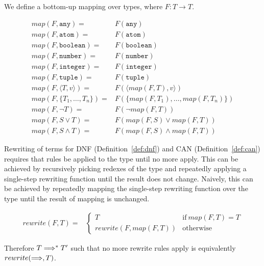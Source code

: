 \documentclass[nonacm,timestamp,manuscript]{acmart}
\newcommand{\atom}[1]{\texttt{#1}}
\newcommand{\singleton}[2]{\langle #1, #2 \rangle} %
\begin{document}
We define a bottom-up mapping over types, where $F : T \rightarrow T$.

\begin{align*}
  map(F, \atom{any}) ={}& F(\atom{any}) \\
  map(F, \atom{atom}) ={}& F(\atom{atom}) \\
  map(F, \atom{boolean}) ={}& F(\atom{boolean}) \\
  map(F, \atom{number}) ={}& F(\atom{number}) \\
  map(F, \atom{integer}) ={}& F(\atom{integer}) \\
  map(F, \atom{tuple}) = {}& F(\atom{tuple}) \\
  map(F, \singleton{T}{v}) ={}& F(\singleton{map(F, T)}{v}) \\
  map(F, \{ T_1, \ldots, T_n \}) ={}& F( \{ map(F, T_1), \ldots, map(F, T_n) \}) \\
  map(F, \neg T) ={}& F(\neg map(F, T)) \\
  map(F, S \lor T) ={}& F(map(F, S) \lor map(F, T)) \\
  map(F, S \land T) ={}& F(map(F, S) \land map(F, T))
\end{align*}


Rewriting of terms for DNF (Definition~\ref{def:dnf}) and CAN
(Definition~\ref{def:can}) requires that rules be applied to the type until no
more apply. This can be achieved by recursively picking redexes of the type
and repeatedly applying a single-step rewriting function until the result does
not change. Naively, this can be achieved by repeatedly mapping the single-step
rewriting function over the type until the result of mapping is unchanged.

\begin{align*}
  rewrite(F, T) ={}&
                     \begin{cases}
                       T & \text{if}\ map(F, T) = T \\
                       rewrite(F, map(F, T)) & \text{otherwise}
                     \end{cases}
\end{align*}

Therefore $T \Longrightarrow^{*} T^{\prime}$ such that no more rewrite rules apply is
equivalently $rewrite(\Longrightarrow, T)$.

\end{document}
